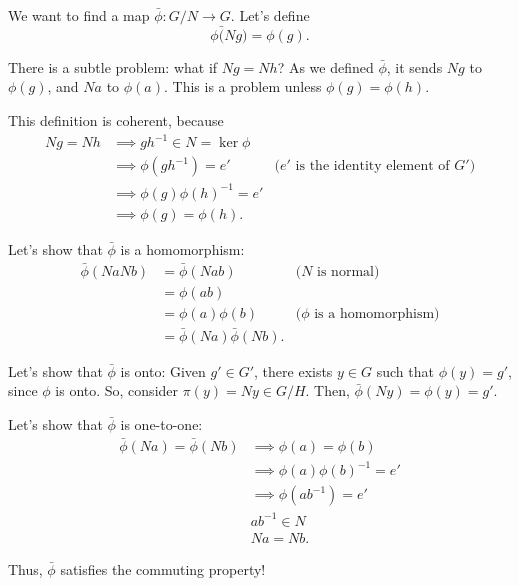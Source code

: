 \begin{dem}
	We want to find a map $\bar\phi: G/N \to G$. Let's define \[\phi\bar(Ng) = \phi(g).\]

	There is a subtle problem: what if $Ng = Nh$? As we defined $\bar\phi$, it sends $Ng$ to $\phi(g)$, and $Na$ to $\phi(a)$. This is a problem unless  $\phi(g) = \phi(h)$.

	This definition is coherent, because \begin{align*}
		Ng = Nh &\implies gh^{-1} \in N = \ker\phi\\
				&\implies \phi(gh^{-1}) = e' & \text{($e'$ is the identity element of $G'$)}\\
				&\implies \phi(g)\phi(h)^{-1} = e'\\
				&\implies \phi(g) = \phi(h).
	\end{align*}

	Let's show that $\bar\phi$ is a homomorphism:
	\begin{align*}
		\bar\phi(NaNb) &= \bar\phi(Nab) & \text{($N$ is normal)}\\
					   &= \phi(ab)\\
					   &= \phi(a)\phi(b) & \text{($\phi$ is a homomorphism)}\\
					   &= \bar\phi(Na)\bar\phi(Nb).
	\end{align*}

	Let's show that $\bar\phi$ is onto: Given  $g' \in G'$, there exists $y \in G$ such that $\phi(y) = g'$, since $\phi$ is onto. So, consider $\pi(y) = Ny \in G/H$. Then,  $\bar\phi(Ny) = \phi(y) = g'$.

	Let's show that $\bar\phi$ is one-to-one:
	\begin{align*}
		\bar\phi(Na) = \bar\phi(Nb) & \implies \phi(a) = \phi(b)\\
									& \implies \phi(a)\phi(b)^{-1} = e'\\
									& \implies \phi(ab^{-1}) = e'\\
									& ab^{-1} \in N\\
									& Na = Nb.
	\end{align*}

	Thus, $\bar\phi$ satisfies the commuting property!
\end{dem}
